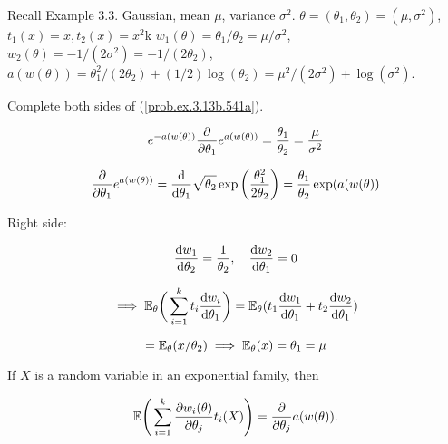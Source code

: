 \begin{example} Recall Example 3.3. Gaussian, mean \(\mu\), variance \(\sigma^2\). \(\theta = (\theta_1, \theta_2) = (\mu, \sigma^2)\), \(t_1(x) = x, t_2(x) = x^2\)k \(w_1(\theta) = \theta_1/\theta_2 = \mu/\sigma^2\), \(w_2(\theta) = - 1/(2\sigma^2) = -1/(2\theta_2)\), \(a(w(\theta)) = \theta_1^2/(2\theta_2) + (1/2) \log(\theta_2) = \mu^2/(2 \sigma^2) + \log(\sigma^2)\).

Complete both sides of (\ref{prob.ex.3.13b.541a}).

\[
e^{-a(w(\theta))} \pderiv{}{\theta_1} e^{a(w(\theta))} = \frac{\theta_1}{\theta_2} = \frac{\mu}{\sigma^2}
\]

\[
 \pderiv{}{\theta_1}e^{a(w(\theta))} = \deriv{}{\theta_1} \sqrt{\theta_2} \exp \bigg( \frac{\theta_1^2}{2 \theta_2} \bigg) = \frac{\theta_1}{\theta_2} \exp(a(w(\theta))
\]

Right side:

\[
\deriv{w_1}{\theta_2} = \frac{1}{\theta_2}, \ \ \ \deriv{w_2}{\theta_1} = 0
\]

\[
\implies \E_{\theta} \bigg( \sum_{i=1}^k t_i \deriv{w_i}{\theta_1} \bigg) = \E_{\theta}(t_1 \deriv{w_1}{\theta_1} + t_2 \deriv{w_2}{\theta_1} ) 
\]

\[
= \E_{\theta} ( x/ \theta_2) \implies \E_{\theta}(x) = \theta_1 =  \mu
\]

\end{example}

\begin{theorem} If \(X\) is a random variable in an exponential family, then

%
\begin{equation}\label{prob.thm.3.4.2.casella}
\E \Bigg( \sum_{i=1}^k \pderiv{w_i(\theta)}{\theta_j} t_i(X) \Bigg) =  \pderiv{}{\theta_j}  a(w(\theta)).
\end{equation}


%
%

\end{theorem}



